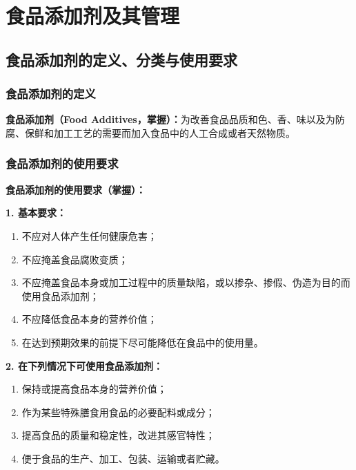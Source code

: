 \chapter{食品添加剂及其管理}
\setcounter{chapter}{9}

\section{食品添加剂的定义、分类与使用要求}

\subsection{食品添加剂的定义}

\begin{keybox}
\textbf{食品添加剂（Food Additives，掌握）：}为改善食品品质和色、香、味以及为防腐、保鲜和加工工艺的需要而加入食品中的人工合成或者天然物质。
\end{keybox}

\subsection{食品添加剂的使用要求}

\begin{keybox}
\textbf{食品添加剂的使用要求（掌握）：}

\textbf{1. 基本要求：}
\begin{enumerate}[leftmargin=*]
    \item 不应对人体产生任何健康危害；
    \item 不应掩盖食品腐败变质；
    \item 不应掩盖食品本身或加工过程中的质量缺陷，或以掺杂、掺假、伪造为目的而使用食品添加剂；
    \item 不应降低食品本身的营养价值；
    \item 在达到预期效果的前提下尽可能降低在食品中的使用量。
\end{enumerate}

\textbf{2. 在下列情况下可使用食品添加剂：}
\begin{enumerate}[leftmargin=*]
    \item 保持或提高食品本身的营养价值；
    \item 作为某些特殊膳食用食品的必要配料或成分；
    \item 提高食品的质量和稳定性，改进其感官特性；
    \item 便于食品的生产、加工、包装、运输或者贮藏。
\end{enumerate}
\end{keybox}


